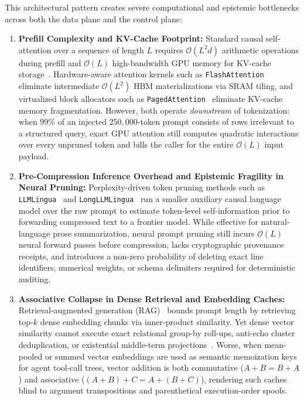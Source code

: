 \documentclass[11pt]{article}
\theoremstyle{plain}
\theoremstyle{definition}
\begin{document}
This architectural pattern creates severe computational and epistemic bottlenecks across both the data plane and the control plane:
\begin{enumerate}
  \item \textbf{Prefill Complexity and KV-Cache Footprint:} Standard causal self-attention over a sequence of length $L$ requires $\mathcal{O}(L^2 d)$ arithmetic operations during prefill and $\mathcal{O}(L)$ high-bandwidth GPU memory for KV-cache storage~\cite{vaswani2017attention}. Hardware-aware attention kernels such as \texttt{FlashAttention}~\cite{dao2022flashattention} eliminate intermediate $\mathcal{O}(L^2)$ HBM materializations via SRAM tiling, and virtualized block allocators such as \texttt{PagedAttention}~\cite{kwon2023vllm} eliminate KV-cache memory fragmentation. However, both operate \emph{downstream} of tokenization: when $99\%$ of an injected $250{,}000$-token prompt consists of rows irrelevant to a structured query, exact GPU attention still computes quadratic interactions over every unpruned token and bills the caller for the entire $\mathcal{O}(L)$ input payload.
  \item \textbf{Pre-Compression Inference Overhead and Epistemic Fragility in Neural Pruning:} Perplexity-driven token pruning methods such as \texttt{LLMLingua}~\cite{jiang2023llmlingua} and \texttt{LongLLMLingua}~\cite{jiang2024longllmlingua} run a smaller auxiliary causal language model over the raw prompt to estimate token-level self-information prior to forwarding compressed text to a frontier model. While effective for natural-language prose summarization, neural prompt pruning still incurs $\mathcal{O}(L)$ neural forward passes before compression, lacks cryptographic provenance receipts, and introduces a non-zero probability of deleting exact line identifiers, numerical weights, or schema delimiters required for deterministic auditing.
  \item \textbf{Associative Collapse in Dense Retrieval and Embedding Caches:} Retrieval-augmented generation (RAG)~\cite{lewis2020rag} bounds prompt length by retrieving top-$k$ dense embedding chunks via inner-product similarity. Yet dense vector similarity cannot execute exact relational group-by roll-ups, anti-echo cluster deduplication, or existential middle-term projections~\cite{codd1970relational,gray1997datacube}. Worse, when mean-pooled or summed vector embeddings are used as semantic memoization keys for agent tool-call trees, vector addition is both commutative ($A + B = B + A$) and associative ($(A + B) + C = A + (B + C)$), rendering such caches blind to argument transpositions and parenthetical execution-order spoofs.
\end{enumerate}
\end{document}
